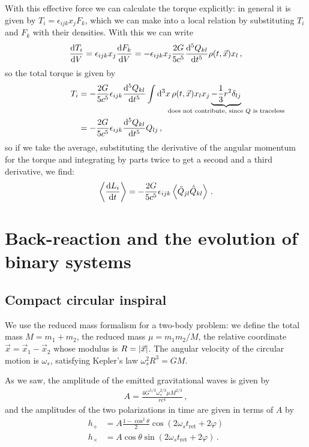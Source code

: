 \documentclass[main.tex]{subfiles}
\begin{document}
With this effective force we can calculate the torque explicitly: in general it is given by \(T_i = \epsilon_{ijk} x_j F_k\), which we can make into a local relation by substituting \(T_i\) and \(F_k\) with their densities. With this we can write 
%
\begin{align}
\dv{T_i}{V} = \epsilon_{ijk} x_j  \dv{F_k}{V} = -
\epsilon_{ijk} x_j  \frac{2G}{5 c^{5}} \dv[5]{Q_{kl}}{t} \rho (t, \vec{x}) x_l
\,,
\end{align}
%
so the total torque is given by
%
\begin{align}
T_{i} &= - \frac{2G}{5 c^{5}} \epsilon_{ijk} \dv[5]{Q_{kl}}{t}
\int \dd[3]{x} \rho (t, \vec{x}) x_l x_j \underbrace{- \frac{1}{3} r^2 \delta_{lj}}_{\mathclap{\text{does not contribute, since \(Q\) is traceless}}} \\
&= - \frac{2G}{5 c^{5}} \epsilon_{ijk} \dv[5]{Q_{kl}}{t} Q_{lj} 
\,,
\end{align}
%
so if we take the average, substituting the derivative of the angular momentum for the torque and integrating by parts twice to get a second and a third derivative, we find:
%
\begin{align}
\expval{\dv{L_{i}}{t}} = -\frac{2G}{5c^{5}} \epsilon_{ijk} 
\expval{\ddot{Q}_{jl} \dot{\ddot{Q}}_{kl}}
\,.
\end{align}

\section{Back-reaction and the evolution of binary systems}

\subsection{Compact circular inspiral}

We use the reduced mass formalism for a two-body problem: we define the total mass \(M = m_1 +m_2 \), the reduced mass \(\mu = m_1 m_2 / M\), the relative coordinate \(\vec{x} = \vec{x}_1 - \vec{x}_2\) whose modulus is \(R = \abs{\vec{x}}\). 
The angular velocity of the circular motion is \(\omega_{s}\), satisfying Kepler's law \(\omega_{s}^2 R^3 = GM\).

As we saw, the amplitude of the emitted gravitational waves is given by 
%
\begin{align}
A = \frac{4 G^{5/3} \omega_{s}^{2/3} \mu M^{2/3}}{r c^{4}}
\,,
\end{align}
%
and the amplitudes of the two polarizations in time are given in terms of \(A\) by
%
\begin{subequations}
\begin{align}
h_{+} &= A \frac{1 - \cos^2\theta   }{2} \cos(2 \omega_{s} t _{\text{ret}} + 2 \varphi ) \\ 
h_{\times } &= A \cos \theta  \sin(2 \omega_{s} t _{\text{ret}} + 2 \varphi )  
\,.
\end{align}
\end{subequations}
\end{document}
